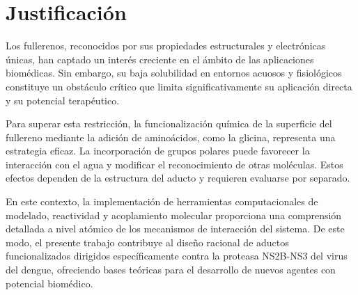 \titleformat{\chapter}[display]
  {\normalfont\bfseries}{}{0pt}{\Large} %
\chapter{Justificación}
Los fullerenos, reconocidos por sus propiedades estructurales y electrónicas únicas, han captado un interés creciente en el ámbito de las aplicaciones biomédicas. Sin embargo, su baja solubilidad en entornos acuosos y fisiológicos constituye un obstáculo crítico que limita significativamente su aplicación directa y su potencial terapéutico.

Para superar esta restricción, la funcionalización química de la superficie del fullereno mediante la adición de aminoácidos, como la glicina, representa una estrategia eficaz. La incorporación de grupos polares puede favorecer la interacción con el agua y modificar el reconocimiento de otras moléculas. Estos efectos dependen de la estructura del aducto y requieren evaluarse por separado.

En este contexto, la implementación de herramientas computacionales de modelado, reactividad y acoplamiento molecular proporciona una comprensión detallada a nivel atómico de los mecanismos de interacción del sistema. De este modo, el presente trabajo contribuye al diseño racional de aductos funcionalizados dirigidos específicamente contra la proteasa NS2B-NS3 del virus del dengue, ofreciendo bases teóricas para el desarrollo de nuevos agentes con potencial biomédico.